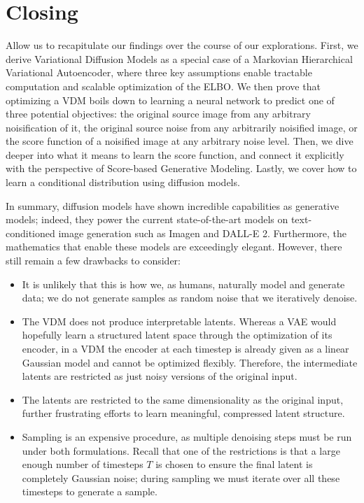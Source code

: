 \section*{Closing}
%
Allow us to recapitulate our findings over the course of our explorations.  First, we derive Variational Diffusion Models as a special case of a Markovian Hierarchical Variational Autoencoder, where three key assumptions enable tractable computation and scalable optimization of the ELBO.  We then prove that optimizing a VDM boils down to learning a neural network to predict one of three potential objectives: the original source image from any arbitrary noisification of it, the original source noise from any arbitrarily noisified image, or the score function of a noisified image at any arbitrary noise level.  Then, we dive deeper into what it means to learn the score function, and connect it explicitly with the perspective of Score-based Generative Modeling.  Lastly, we cover how to learn a conditional distribution using diffusion models.

In summary, diffusion models have shown incredible capabilities as generative models; indeed, they power the current state-of-the-art models on text-conditioned image generation such as Imagen and DALL-E 2.  Furthermore, the mathematics that enable these models are exceedingly elegant.  However, there still remain a few drawbacks to consider:
\begin{itemize}
    \item It is unlikely that this is how we, as humans, naturally model and generate data; we do not generate samples as random noise that we iteratively denoise.
    \item The VDM does not produce interpretable latents.  Whereas a VAE would hopefully learn a structured latent space through the optimization of its encoder, in a VDM the encoder at each timestep is already given as a linear Gaussian model and cannot be optimized flexibly.  Therefore, the intermediate latents are restricted as just noisy versions of the original input.
    \item The latents are restricted to the same dimensionality as the original input, further frustrating efforts to learn meaningful, compressed latent structure.
    \item Sampling is an expensive procedure, as multiple denoising steps must be run under both formulations.  Recall that one of the restrictions is that a large enough number of timesteps $T$ is chosen to ensure the final latent is completely Gaussian noise; during sampling we must iterate over all these timesteps to generate a sample.
\end{itemize}

